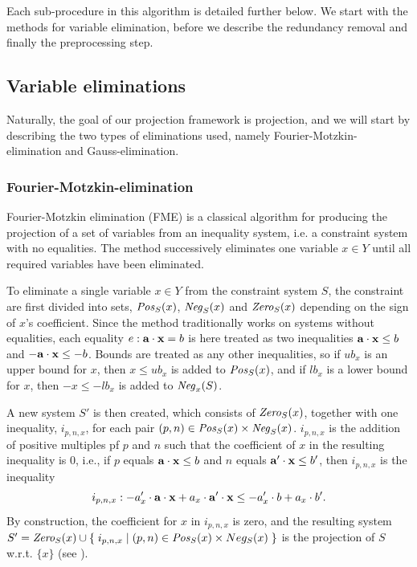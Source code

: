 Each sub-procedure in this algorithm is detailed further below. We start with the methods for variable elimination, before we describe the redundancy removal and finally the preprocessing step.

\subsection{Variable eliminations}
Naturally, the goal of our projection framework is projection, and we will start by describing the two types of eliminations used, namely Fourier-Motzkin-elimination and Gauss-elimination. 
\subsubsection{Fourier-Motzkin-elimination}
Fourier-Motzkin elimination (FME) is a classical algorithm for producing the projection of a set of variables from an inequality system, i.e. a constraint system with no equalities.
The method successively eliminates one variable $x\in Y$ until all required variables have been eliminated.  

To eliminate a single variable $x\in Y$ from the constraint system $S$, the constraint are first divided into sets, $\mathit{Pos}_S(x)$, $\mathit{Neg}_S(x)$ and $\mathit{Zero}_S(x)$ depending on the sign of $x$'s coefficient. Since the method traditionally works on systems without equalities, each equality $e: \mathbf{a}\cdot\mathbf{x} = b$ is here treated as two inequalities $\mathbf{a}\cdot\mathbf{x} \leq b$ and $-\mathbf{a}\cdot\mathbf{x} \leq -b$. Bounds are treated as any other inequalities, so if $ub_x$ is an upper bound for $x$, then $x\leq ub_x$ is added to $\mathit{Pos}_S(x)$, and if $lb_x$ is a lower bound for $x$, then $-x\leq - lb_x$ is added to $\mathit{Neg}_x(S)$.

A new system $S'$ is then created, which consists of $\mathit{Zero}_S(x)$, together with one inequality, $i_{p,n,x}$, for each pair $(p,n)\in \mathit{Pos}_S(x)\times \mathit{Neg}_S(x)$. $i_{p,n,x}$ is the addition of positive multiples pf $p$ and $n$ such that the coefficient of $x$ in the resulting inequality is $0$, i.e., if $p$ equals $\mathbf{a}\cdot\mathbf{x} \leq b$ and $n$ equals $\mathbf{a}'\cdot\mathbf{x} \leq b'$, then $i_{p,n,x}$ is the inequality 
\[
i_{p,n,x}: -a'_x\cdot \mathbf{a}\cdot\mathbf{x} + a_x\cdot \mathbf{a}'\cdot\mathbf{x} \leq -a'_x\cdot b + a_x\cdot b'.
\]
By construction, the coefficient for $x$ in $i_{p,n,x}$ is zero, and the resulting system $S' = \mathit{Zero}_S(x) \cup\\
\{\;{i_{p,n,x}}\;|\;{(p,n)\in \mathit{Pos}_S(x)\times Neg_S(x)}\;\}$ is the projection of $S$ w.r.t. $\{x\}$ (see \cite{MyTechRep}). %

